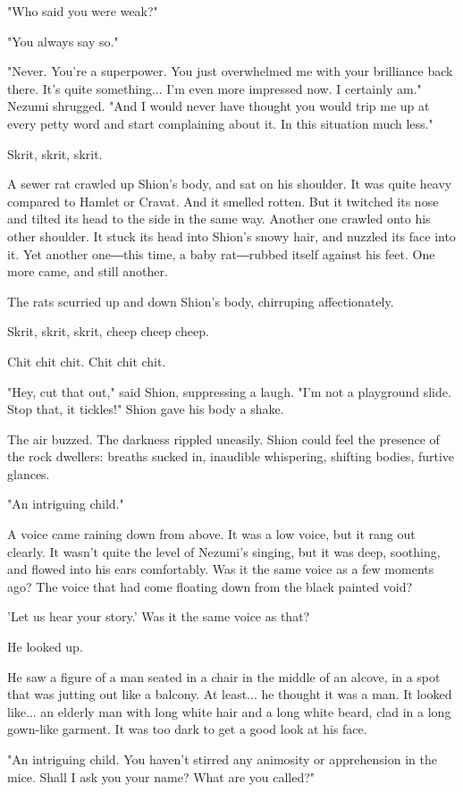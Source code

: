 "Who said you were weak?"

"You always say so."

"Never. You're a superpower. You just overwhelmed me with your
brilliance back there. It's quite something... I'm even more impressed
now. I certainly am." Nezumi shrugged. "And I would never have thought
you would trip me up at every petty word and start complaining about it.
In this situation much less."

Skrit, skrit, skrit.

A sewer rat crawled up Shion's body, and sat on his shoulder. It was
quite heavy compared to Hamlet or Cravat. And it smelled rotten. But it
twitched its nose and tilted its head to the side in the same way.
Another one crawled onto his other shoulder. It stuck its head into
Shion's snowy hair, and nuzzled its face into it. Yet another one―this
time, a baby rat―rubbed itself against his feet. One more came, and
still another.

The rats scurried up and down Shion's body, chirruping affectionately.

Skrit, skrit, skrit, cheep cheep cheep.

Chit chit chit. Chit chit chit.

"Hey, cut that out," said Shion, suppressing a laugh. "I'm not a
playground slide. Stop that, it tickles!" Shion gave his body a shake.

The air buzzed. The darkness rippled uneasily. Shion could feel the
presence of the rock dwellers: breaths sucked in, inaudible whispering,
shifting bodies, furtive glances.

"An intriguing child."

A voice came raining down from above. It was a low voice, but it rang
out clearly. It wasn't quite the level of Nezumi's singing, but it was
deep, soothing, and flowed into his ears comfortably. Was it the same
voice as a few moments ago? The voice that had come floating down from
the black painted void?

'Let us hear your story.' Was it the same voice as that?

He looked up.

He saw a figure of a man seated in a chair in the middle of an alcove,
in a spot that was jutting out like a balcony. At least... he thought it
was a man. It looked like... an elderly man with long white hair and a
long white beard, clad in a long gown-like garment. It was too dark to
get a good look at his face.

"An intriguing child. You haven't stirred any animosity or apprehension
in the mice. Shall I ask you your name? What are you called?"

